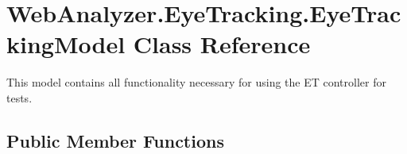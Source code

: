 \hypertarget{class_web_analyzer_1_1_eye_tracking_1_1_eye_tracking_model}{}\section{Web\+Analyzer.\+Eye\+Tracking.\+Eye\+Tracking\+Model Class Reference}
\label{class_web_analyzer_1_1_eye_tracking_1_1_eye_tracking_model}


This model contains all functionality necessary for using the E\+T controller for tests.  


\subsection*{Public Member Functions}
